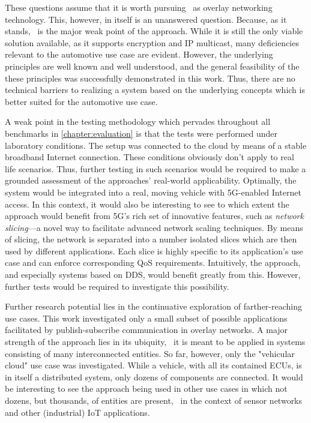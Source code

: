 These questions assume that it is worth pursuing \wnet\ as overlay networking technology. This, however, in itself is an unanswered question. Because, as it stands, \wnet\ is the major weak point of the approach. While it is still the only viable solution available, as it supports encryption and IP multicast, many deficiencies relevant to the automotive use case are evident. However, the underlying principles are well known and well understood, and the general feasibility of the these principles was successfully demonstrated in this work. Thus, there are no technical barriers to realizing a system based on the underlying concepts which is better suited for the automotive use case. 

 A weak point in the testing methodology which pervades throughout all benchmarks in \autoref{chapter:evaluation} is that the tests were performed under laboratory conditions. The setup was connected to the cloud by means of a stable broadband Internet connection. These conditions obviously don't apply to real life scenarios. Thus, further testing in such scenarios would be required to make a grounded assessment of the approaches' real-world applicability. Optimally, the system would be integrated into a real, moving vehicle with 5G-enabled Internet access. In this context, it would also be interesting to see to which extent the approach would benefit from 5G's rich set of innovative features, such as \emph{network slicing}---a novel way to facilitate advanced network scaling techniques. By means of slicing, the network is separated into a number isolated slices which are then used by different applications. Each slice is highly specific to its application's use case and can enforce corresponding QoS requirements. Intuitively, the approach, and especially systems based on DDS, would benefit greatly from this. However, further tests would be required to investigate this possibility.

Further research potential lies in the continuative exploration of farther-reaching use cases. This work investigated only a small subset of possible applications facilitated by publish-subscribe communication in overlay networks. A major strength of the approach lies in its ubiquity, \ie\ it is meant to be applied in systems consisting of many interconnected entities. So far, however, only the "vehicular cloud" use case was investigated. While a vehicle, with all its contained ECUs, is in itself a distributed system, only dozens of components are connected. It would be interesting to see the approach being used in other use cases in which not dozens, but thousands, of entities are present, \eg\ in the context of sensor networks and other (industrial) IoT applications. 

